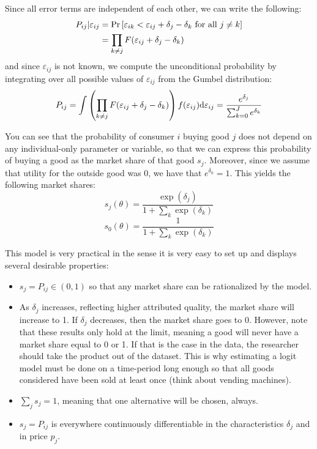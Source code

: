 Since all error terms are independent of each other, we can write the following:\begin{align*} P_{ij}\vert \varepsilon_{ij} & = \operatorname{Pr}\left[ \varepsilon_{ik} < \varepsilon_{ij} + \delta_j - \delta_k \text{ for all } j\neq k \right] \\ & = \prod_{k\neq j} F(\varepsilon_{ij} + \delta_j - \delta_k)
\end{align*} and since $\varepsilon_{ij}$ is not known, we compute the unconditional probability by integrating over all possible values of $\varepsilon_{ij}$ from the Gumbel distribution: $$ P_{ij} = \int \left(\prod_{k\neq j} F(\varepsilon_{ij} + \delta_j - \delta_k)\right) f(\varepsilon_{ij})\mathrm{d}\varepsilon_{ij} = \frac{ e^{\delta_{j}} }{ \sum_{k=0}^{J} e^{\delta_{k}} } $$

You can see that the probability of consumer $i$ buying good $j$ does not depend on any individual-only parameter or variable, so that we can express this probability of buying a good as the market share of that good $s_j$. Moreover, since we assume that utility for the outside good was 0, we have that $e^{\delta_0} = 1$. This yields the following market shares: $$s_j(\theta) = \frac{\exp(\delta_j)}{1 + \sum_{k} \exp(\delta_{k})} $$ $$s_0(\theta) = \frac{1}{1 + \sum_{k} \exp(\delta_{k})} $$

This model is very practical in the sense it is very easy to set up and displays several desirable properties:\begin{itemize}
\item $s_j = P_{ij}\in(0,1)$ so that any market share can be rationalized by the model.
\item As $\delta_{j}$ increases, reflecting higher attributed quality, the market share will increase to 1. If $\delta_j$ decreases, then the market share goes to 0. However, note that these results only hold at the limit, meaning a good will never have a market share equal to 0 or 1. If that is the case in the data, the researcher should take the product out of the dataset. This is why estimating a logit model must be done on a time-period long enough so that all goods considered have been sold at least once (think about vending machines).
\item $\sum_j s_j = 1$, meaning that one alternative will be chosen, always.
\item $s_j = P_{ij}$ is everywhere continuously differentiable in the characteristics $\delta_{j}$ and in price $p_j$.
\end{itemize}

